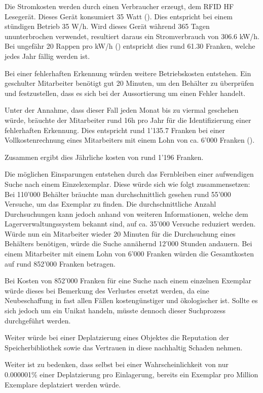 Die Stromkosten werden durch einen Verbraucher erzeugt, dem RFID HF Lesegerät. Dieses Gerät konsumiert 35 Watt (\cite{DatenblattRFIDReader}). Dies entspricht bei einem stündigen Betrieb 35 W/h. Wird dieses Gerät während 365 Tagen ununterbrochen verwendet, resultiert daraus ein Stromverbrauch von 306.6 kW/h. Bei ungefähr 20 Rappen pro kW/h (\cite{StromPreisAdmin2019}) entspricht dies rund 61.30 Franken, welche jedes Jahr fällig werden ist.

Bei einer fehlerhaften Erkennung würden weitere Betriebskosten entstehen. Ein geschulter Mitarbeiter benötigt gut 20 Minuten, um den Behälter zu überprüfen und festzustellen, dass es sich bei der Aussortierung um einen Fehler handelt.

Unter der Annahme, dass dieser Fall jeden Monat bis zu viermal geschehen würde, bräuchte der Mitarbeiter rund 16h pro Jahr für die Identifizierung einer fehlerhaften Erkennung. Dies entspricht rund 1'135.7 Franken bei einer Vollkostenrechnung eines Mitarbeiters mit einem Lohn von ca. 6'000 Franken (\cite{KostenProMitarbeiter2013}).

Zusammen ergibt dies Jährliche kosten von rund 1'196 Franken.

Die möglichen Einsparungen entstehen durch das Fernbleiben einer aufwendigen Suche nach einem Einzelexemplar. Diese würde sich wie folgt zusammensetzen:
Bei 110'000 Behälter bräuchte man durchschnittlich gesehen rund 55'000 Versuche, um das Exemplar zu finden. Die durchschnittliche Anzahl Durchsuchungen kann jedoch anhand von weiteren Informationen, welche dem Lagerverwaltungssystem bekannt sind, auf ca. 35'000 Versuche reduziert werden. Würde nun ein Mitarbeiter wieder 20 Minuten für die Durchsuchung eines Behälters benötigen, würde die Suche annähernd 12'000 Stunden andauern. Bei einem Mitarbeiter mit einem Lohn von 6'000 Franken würden die Gesamtkosten auf rund 852'000 Franken betragen.

Bei Kosten von 852'000 Franken für eine Suche nach einem einzelnen Exemplar würde dieses bei Bemerkung des Verlustes ersetzt werden, da eine Neubeschaffung in fast allen Fällen kostengünstiger und ökologischer ist. Sollte es sich jedoch um ein Unikat handeln, müsste dennoch dieser Suchprozess durchgeführt werden.

Weiter würde bei einer Deplatzierung eines Objektes die Reputation der Speicherbibliothek sowie das Vertrauen in diese nachhaltig Schaden nehmen.

Weiter ist zu bedenken, dass selbst bei einer Wahrscheinlichkeit von nur 0.000001\% einer Deplatzierung pro Einlagerung, bereits ein Exemplar pro Million Exemplare deplatziert werden würde.

